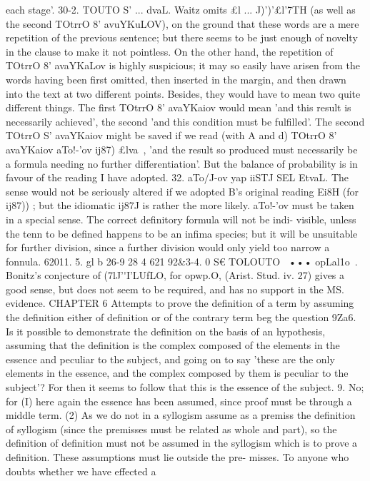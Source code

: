 {{{{{{{{{{{{{{{{{{{{each stage'.
30-2. TOUTO S' ... dvaL. Waitz omits £l ... J)')'£l'7TH (as well
as the second TOtrrO 8' avuYKuLOV), on the ground that these words
are a mere repetition of the previous sentence; but there seems
to be just enough of novelty in the clause to make it not pointless.
On the other hand, the repetition of TOtrrO 8' avaYKaLov is highly
suspicious; it may so easily have arisen from the words having
been first omitted, then inserted in the margin, and then drawn
into the text at two different points. Besides, they would have
to mean two quite different things. The first TOtrrO 8' avaYKaiov
would mean 'and this result is necessarily achieved', the second
'and this condition must be fulfilled'. The second TOtrrO S'
avaYKaiov might be saved if we read (with A and d) TOtrrO 8'
avaYKaiov aTo!-'ov ij87) £lva~, 'and the result so produced must
necessarily be a formula needing no further differentiation'. But
the balance of probability is in favour of the reading I have
adopted.
32. aTo/J-ov yap iiSTJ SEL EtvaL. The sense would not be seriously
altered if we adopted B's original reading Ei8H (for ij87)) ; but the
idiomatic ij87J is rather the more likely. aTo!-'ov must be taken in
a special sense. The correct definitory formula will not be indi-
visible, unless the tenn to be defined happens to be an infima
species; but it will be unsuitable for further division, since a
further division would only yield too narrow a fonnula.
62011. 5.
gl b 26-9 28 4
621
92&3-4. 0 S€ TOLOUTO~ ••• opLal1o~. Bonitz's conjecture of
(7lJ'\'\0I'LUfLO, for opwp.O, (Arist. Stud. iv. 27) gives a good sense, but
does not seem to be required, and has no support in the MS.
evidence.
CHAPTER 6
Attempts to prove the definition of a term by assuming the definition
either of definition or of the contrary term beg the question
9Za6. Is it possible to demonstrate the definition on the basis
of an hypothesis, assuming that the definition is the complex
composed of the elements in the essence and peculiar to the
subject, and going on to say 'these are the only elements in
the essence, and the complex composed by them is peculiar to
the subject'? For then it seems to follow that this is the essence
of the subject.
9. No; for (I) here again the essence has been assumed, since
proof must be through a middle term. (2) As we do not in a
syllogism assume as a premiss the definition of syllogism (since
the premisses must be related as whole and part), so the definition
of definition must not be assumed in the syllogism which is to
prove a definition. These assumptions must lie outside the pre-
misses. To anyone who doubts whether we have effected a
}}}}}}}}}}}}}}}}}}}}
